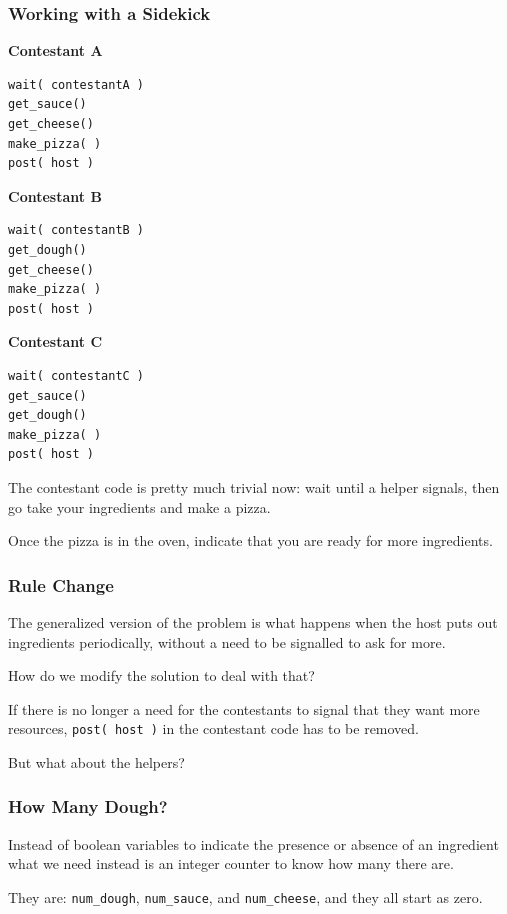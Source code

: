 \begin{frame}[fragile]
\frametitle{Working with a Sidekick}

\begin{multicols}{3}
\textbf{Contestant A}
\begin{lstlisting}
wait( contestantA )
get_sauce()
get_cheese()
make_pizza( )
post( host )
\end{lstlisting}
\columnbreak
\textbf{Contestant B}
\begin{lstlisting}
wait( contestantB )
get_dough()
get_cheese()
make_pizza( )
post( host )
\end{lstlisting}
\columnbreak
\textbf{Contestant C}
\begin{lstlisting}
wait( contestantC )
get_sauce()
get_dough()
make_pizza( )
post( host )
\end{lstlisting}
\end{multicols}

The contestant code is pretty much trivial now: wait until a helper signals, then go take your ingredients and make a pizza. 

Once the pizza is in the oven, indicate that you are ready for more ingredients.

\end{frame}

\begin{frame}
\frametitle{Rule Change}

The generalized version of the problem is what happens when the host puts out ingredients periodically, without a need to be signalled to ask for more. 

How do we modify the solution to deal with that?

If there is no longer a need for the contestants to signal that they want more resources, \texttt{post( host )} in the contestant code has to be removed. 

But what about the helpers?

\end{frame}

\begin{frame}
\frametitle{How Many Dough?}

Instead of boolean variables to indicate the presence or absence of an ingredient what we need instead is an integer counter to know how many there are. 

They are: \texttt{num\_dough}, \texttt{num\_sauce}, and \texttt{num\_cheese}, and they all start as zero.

\end{frame}

